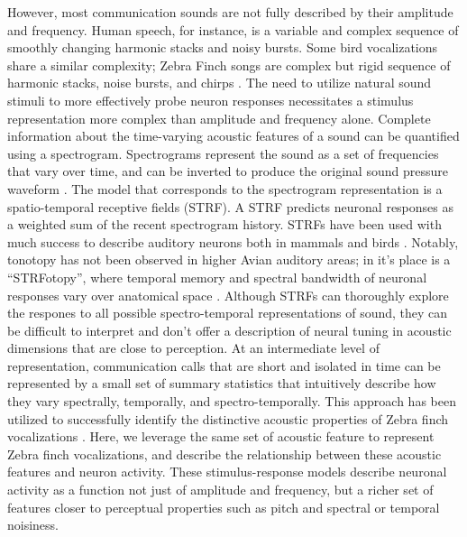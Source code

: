 However, most communication sounds are not fully described by their amplitude and frequency. Human speech, for instance, is a variable and complex sequence of smoothly changing harmonic stacks and noisy bursts. Some bird vocalizations share a similar complexity; Zebra Finch songs are complex but rigid sequence of harmonic stacks, noise bursts, and chirps \cite{Elie2015b}. The need to utilize natural sound stimuli to more effectively probe neuron responses necessitates a stimulus representation more complex than amplitude and frequency alone. Complete information about the time-varying acoustic features of a sound can be quantified using a spectrogram. Spectrograms represent the sound as a set of frequencies that vary over time, and can be inverted to produce the original sound pressure waveform \cite{Cohen1995}. The model that corresponds to the spectrogram representation is a spatio-temporal receptive fields (STRF). A STRF predicts neuronal responses as a weighted sum of the recent spectrogram history. STRFs have been used with much success to describe auditory neurons both in mammals and birds \cite{Theunissen2000}. Notably, tonotopy has not been observed in higher Avian auditory areas; in it’s place is a “STRFotopy”, where temporal memory and spectral bandwidth of neuronal responses vary over anatomical space \cite{Kim2011}. Although STRFs can thoroughly explore the respones to all possible spectro-temporal representations of sound, they can be difficult to interpret and don’t offer a description of neural tuning in acoustic dimensions that are close to perception.
At an intermediate level of representation, communication calls that are short and isolated in time can be represented by a small set of summary statistics that intuitively describe how they vary spectrally, temporally, and spectro-temporally. This approach has been utilized to successfully identify the distinctive acoustic properties of Zebra finch vocalizations \cite{Elie2015b}. Here, we leverage the same set of acoustic feature to represent Zebra finch vocalizations, and describe the relationship between these acoustic features and neuron activity. These stimulus-response models describe neuronal activity as a function not just of amplitude and frequency, but a richer set of features closer to perceptual properties such as pitch and spectral or temporal noisiness.

